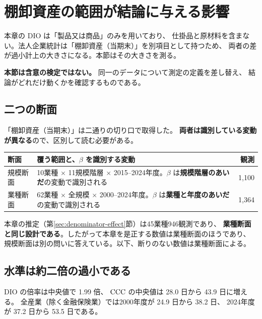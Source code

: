 \section{棚卸資産の範囲が結論に与える影響}
\label{sec:inventory-scope}

本章の $\mathrm{DIO}$ は「製品又は商品」のみを用いており、
仕掛品と原材料を含まない。法人企業統計は「棚卸資産（当期末）」を別項目として持つため、
両者の差が過小計上の大きさになる。本節はその大きさを測る。

\textbf{本節は含意の検定ではない。} 同一のデータについて測定の定義を差し替え、
結論がどれだけ動くかを確認するものである。

\subsection{二つの断面}

「棚卸資産（当期末）」は二通りの切り口で取得した。
\textbf{両者は識別している変動が異なる}ので、区別して読む必要がある。

\begin{center}
\begin{tabularx}{\textwidth}{@{}lXr@{}}
\toprule
断面 & 覆う範囲と、$\beta$ を識別する変動 & 観測 \\
\midrule
規模断面 & 10業種 $\times$ 11規模階層 $\times$ 2015--2024年度。$\beta$ は\textbf{規模階層のあいだ}の変動で識別される & 1,100 \\
業種断面 & 62業種 $\times$ 全規模 $\times$ 2000--2024年度。$\beta$ は\textbf{業種と年度のあいだ}の変動で識別される & 1,364 \\
\bottomrule
\end{tabularx}
\label{tab:inventory-cuts}
\end{center}

本章の推定（第\ref{sec:denominator-effect}節）は45業種946観測であり、
\textbf{業種断面と同じ設計である}。したがって本章を是正する数値は業種断面のほうであり、
規模断面は別の問いに答えている。以下、断りのない数値は業種断面による。

\subsection{水準は約二倍の過小である}

$\mathrm{DIO}$ の倍率は中央値で 1.99 倍、
$\mathrm{CCC}$ の中央値は 28.0 日から 43.9 日に増える。
全産業（除く金融保険業）では2000年度が 24.9 日から 38.2 日、
2024年度が 37.2 日から 53.5 日である。

